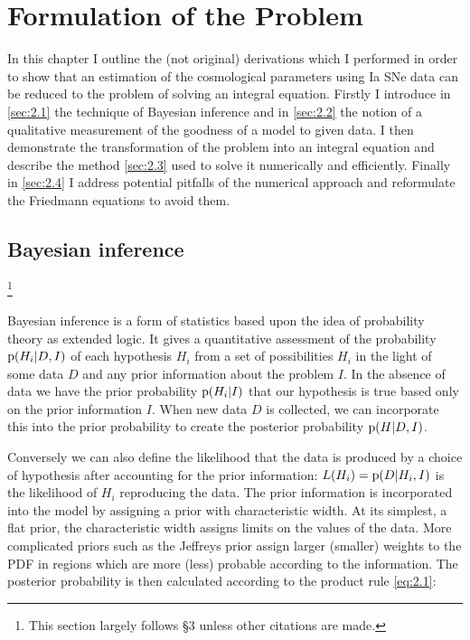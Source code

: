 \chapter{Formulation of the Problem}
\label{ch:formulation}

In this chapter I outline the (not original) derivations which I performed in order to show that an estimation of the cosmological parameters using Ia SNe data can be reduced to the problem of solving an integral equation. Firstly I introduce in \cref{sec:2.1} the technique of Bayesian inference and in \cref{sec:2.2} the notion of a qualitative measurement of the goodness of a model to given data. I then demonstrate the transformation of the problem into an integral equation and describe the method \cref{sec:2.3} used to solve it numerically and efficiently. Finally in \cref{sec:2.4} I address potential pitfalls of the numerical approach and reformulate the Friedmann equations to avoid them.

\section{Bayesian inference}\footnote{This section largely follows \cite{Gregory2005} §3 unless other citations are made.}
\label{sec:2.1}

Bayesian inference is a form of statistics based upon the idea of probability theory as extended logic. It gives a quantitative assessment of the probability $\prob{H_i}[D, I]$ of each hypothesis $H_i$ from a set of possibilities ${H_i}$ in the light of some data $D$ and any prior information about the problem $I$. In the absence of data we have the prior probability $\prob{H_i}[I]$ that our hypothesis is true based only on the prior information $I$. When new data $D$ is collected, we can incorporate this into the prior probability to create the posterior probability $\prob{H}[D,I]$. 

Conversely we can also define the likelihood that the data is produced by a choice of hypothesis after accounting for the prior information: $L(H_i) = \prob{D}[H_i,I]$ is the likelihood of $H_i$ reproducing the data. The prior information is incorporated into the model by assigning a prior with characteristic width. At its simplest, a flat prior, the characteristic width assigns limits on the values of the data. More complicated priors such as the Jeffreys prior assign larger (smaller) weights to the PDF in regions which are more (less) probable according to the information. The posterior probability is then calculated according to the product rule \cref{eq:2.1}:

